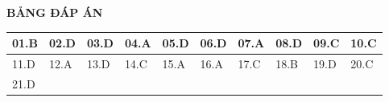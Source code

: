 \loigiai
{
	\begin{center}
		\textbf{BẢNG ĐÁP ÁN}
	\end{center}
	\begin{center}
		\begin{tabular}{|m{2.8em}|m{2.8em}|m{2.8em}|m{2.8em}|m{2.8em}|m{2.8em}|m{2.8em}|m{2.8em}|m{2.8em}|m{2.8em}|}
			\hline
			01.B  & 02.D  & 03.D  & 04.A  & 05.D  & 06.D  & 07.A & 08.D & 09.C & 10.C \\
			\hline
			11.D  & 12.A  & 13.D  & 14.C  & 15.A  & 16.A  & 17.C & 18.B & 19.D & 20.C \\
			\hline
			21.D  &  &  &  &  &  & &  &  &  \\
			\hline
			
		\end{tabular}
	\end{center}
}

